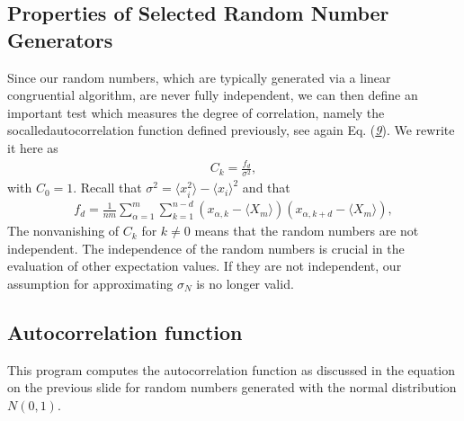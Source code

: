 \documentclass[letterpaper,10pt,english]{sphinxmanual}
\begin{document}
\subsection{Properties of Selected Random Number Generators}
\label{\detokenize{chapter3:id15}}
Since our random numbers, which are typically generated via a linear congruential algorithm,
are never fully independent, we can then define
an important test which measures the degree of correlation, namely the  so\sphinxhyphen{}calledauto\sphinxhyphen{}correlation function defined previously, see again Eq. ({\hyperref[\detokenize{chapter3:eq:autocorrelformal}]{\emph{9}}}).
We rewrite it here as
\begin{equation*}
\begin{split}
C_k=\frac{f_d}
             {\sigma^2},
\end{split}
\end{equation*}
with \(C_0=1\). Recall that
\(\sigma^2=\langle x_i^2\rangle-\langle x_i\rangle^2\) and that
\begin{equation*}
\begin{split}
f_d = \frac{1}{nm}\sum_{\alpha=1}^m\sum_{k=1}^{n-d}(x_{\alpha,k}-\langle X_m \rangle)(x_{\alpha,k+d}-\langle X_m \rangle),
\end{split}
\end{equation*}
The non\sphinxhyphen{}vanishing of \(C_k\) for \(k\ne 0\) means that the random
numbers are not independent. The independence of the random numbers is crucial
in the evaluation of other expectation values. If they are not independent, our
assumption for approximating \(\sigma_N\) is no longer valid.


\subsection{Autocorrelation function}
\label{\detokenize{chapter3:autocorrelation-function}}
This program computes the autocorrelation function as discussed in the equation on the previous slide for random numbers generated with the normal distribution \(N(0,1)\).
\end{document}
